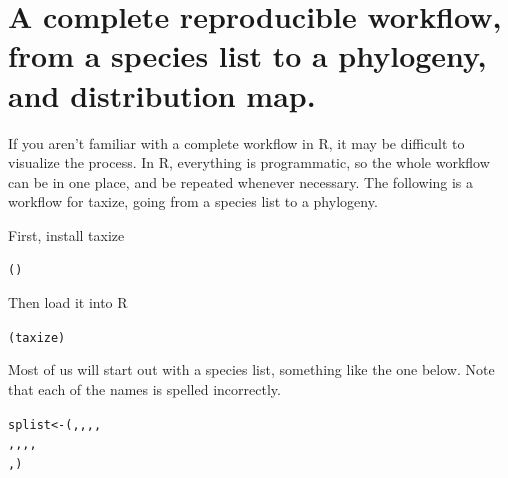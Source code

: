 \section{A complete reproducible workflow, from a species list to a phylogeny, and distribution map.} 

If you aren't familiar with a complete workflow in R, it may be difficult to visualize the process. In R, everything is programmatic, so the whole workflow can be in one place, and be repeated whenever necessary. The following is a workflow for taxize, going from a species list to a phylogeny. 

First, install taxize

\begin{knitrout}
\color{fgcolor}\begin{kframe}
\begin{alltt}
()
\end{alltt}
\end{kframe}
\end{knitrout}


Then load it into R

\begin{knitrout}
\color{fgcolor}\begin{kframe}
\begin{alltt}
(taxize)
\end{alltt}
\end{kframe}
\end{knitrout}


Most of us will start out with a species list, something like the one below. Note that each of the names is spelled incorrectly.

\begin{knitrout}
\color{fgcolor}\begin{kframe}
\begin{alltt}
splist <- (, , , , 
    , , , , 
    , )
\end{alltt}
\end{kframe}
\end{knitrout}


